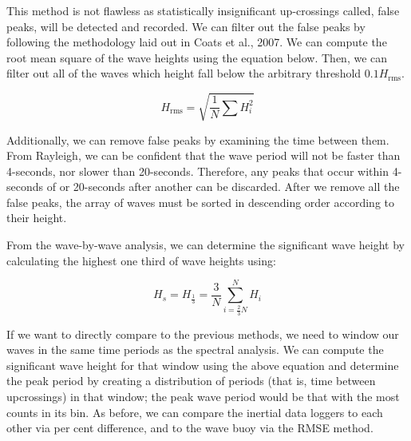 This method is not flawless as statistically insignificant up-crossings called, false peaks, will be detected and recorded. 
We can filter out the false peaks by following the methodology laid out in Coats et al., 2007. 
We can compute the root mean square of the wave heights using the equation below. 
Then, we can filter out all of the waves which height fall below the arbitrary threshold $0.1H_{\text{rms}}$.

\begin{equation}
    H_{\text{rms}} = \sqrt{\frac{1}{N} \sum{H_i^2}}
\end{equation}

Additionally, we can remove false peaks by examining the time between them. 
From Rayleigh, we can be confident that the wave period will not be faster than 4-seconds, nor slower than 20-seconds. 
Therefore, any peaks that occur within 4-seconds of or 20-seconds after another can be discarded. 
After we remove all the false peaks, the array of waves must be sorted in descending order according to their height.

From the wave-by-wave analysis, we can determine the significant wave height by calculating the highest one third of wave heights using:

\begin{equation}
    H_s = H_{\frac{1}{3}} = \frac{3}{N} \sum_{i=\frac{2}{3}N}^N H_i
\end{equation}

If we want to directly compare to the previous methods, we need to window our waves in the same time periods as the spectral analysis. 
We can compute the significant wave height for that window using the above equation and determine the peak period by creating a distribution of periods (that is, time between upcrossings) in that window; the peak wave period would be that with the most counts in its bin. 
As before, we can compare the inertial data loggers to each other via per cent difference, and to the wave buoy via the RMSE method.